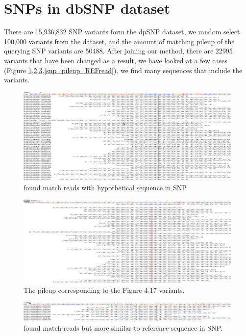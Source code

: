 \section{SNPs in dbSNP dataset}

There are 15,936,832 SNP variants form the dpSNP dataset, we random select 100,000 variants from the dataset, and the amount of matching pileup of the querying SNP variants are 50488. After joining our method, there are 22995 variants that have been changed as a result, we have looked at a few cases (Figure \ref{snp_new_ALTread},\ref{snp_pileup_ALTread},\ref{snp_new_REFread},\ref{snp_pileup_REFread}), we find many sequences that include the variants.


\begin{figure}[H]
\centering
\includegraphics[width=1\columnwidth]{body/image/snp_new_ALTread.png}
\caption[SNP match reads]{ found match reads with hypothetical sequence in SNP.}
\label{snp_new_ALTread}
\end{figure}

\begin{figure}[H]
\centering
\includegraphics[width=1\columnwidth]{body/image/snp_pileup_ALTread.png}
\caption[Figure 4.17 pileup]{ The pileup corresponding to the Figure 4-17 variants.}
\label{snp_pileup_ALTread}
\end{figure}

\begin{figure}[H]
\centering
\includegraphics[width=1\columnwidth]{body/image/snp_new_REFread.png}
\caption[SNP worse match reads]{ found match reads but more similar to reference sequence in SNP.}
\label{snp_new_REFread}
\end{figure}

